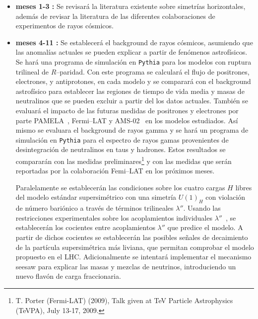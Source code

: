 \documentclass[11pt]{article}
\begin{document}
\begin{itemize}

\item {\bf meses 1-3 :} Se revisará la literatura existente sobre
  simetrías horizontales, además de revisar la literatura de  las diferentes colaboraciones de experimentos de rayos cósmicos.

\item {\bf meses 4-11 : }   Se establecerá el background de rayos cósmicos, asumiendo que las anomalías actuales se pueden explicar a partir de fenómenos astrofísicos. Se hará una programa de simulación en \texttt{Pythia} \cite{Sjostrand:2006za} para los modelos con ruptura trilineal de $R$--paridad.
Con este programa se calculará el flujo de positrones, electrones, y antiprotones, en cada modelo y se comparará con el background astrofísico para establecer las regiones de tiempo de vida media y masas de neutralinos que se pueden excluir a partir del los datos actuales. También se evaluará el impacto de las futuras medidas de positrones y electrones por parte PAMELA~\cite{Adriani:2008zr}, Fermi--LAT\cite{Abdo:2009zk} y AMS-02~\cite{ams:2009} en los modelos estudiados. Así mismo se evaluara el background de rayos gamma y se hará un programa de simulación en \texttt{Pythia} para el espectro de rayos gamas provenientes de desintegración de neutralinos en taus y hadrones.
Estos resultados se compararán con las medidas preliminares\footnote{T. Porter (Fermi-LAT) (2009), Talk given at TeV Particle Astrophysics (TeVPA), July 13-17, 2009.} y con las medidas que serán reportadas por la colaboración Femi--LAT en los próximos meses.

Paralelamente se establecerán las condiciones sobre los cuatro cargas $H$ libres del modelo estándar supersimétrico con una simetría $U(1)_H$ con violación de número bariónico a través de términos trilineales $\lambda''$. Usando las restricciones experimentales sobre los acoplamientos individuales $\lambda''$~\cite{Barbier:2004ez}, se establecerán los cocientes entre acoplamientos $\lambda''$ que predice el modelo. A partir de dichos cocientes se establecerán las posibles señales de decaimiento de la partícula supersimétrica más liviana,  que permitan comprobar el modelo propuesto en el LHC. Adicionalmente se intentará implementar el mecanismo seesaw para explicar las masas y mezclas de neutrinos, introduciendo un nuevo flavón de carga fraccionaria.


\end{itemize}
\end{document}
